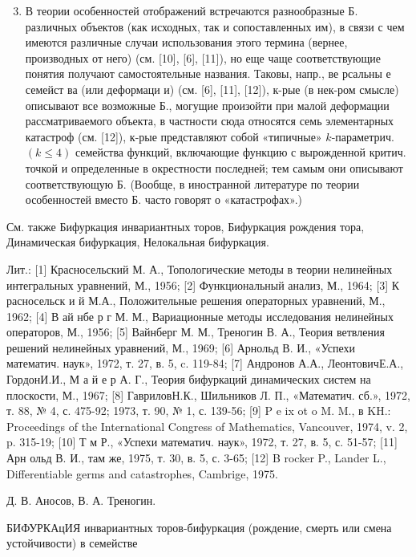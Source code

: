 \documentclass[10pt]{article}
\begin{document}
\begin{enumerate}

  \setcounter{enumi}{2}

  \item В теории особенностей отображений встречаются разнообразные Б. различных объектов (как исходных, так и сопоставленных им), в связи с чем имеются различные случаи использования этого термина (вернее, производных от него) (см. [10], [6], [11]), но еще чаще соответствующие понятия получают самостоятельные названия. Таковы, напр., ве рсальны е семейст ва (или деформаци и) (см. [6], [11], [12]), к-рые (в нек-ром смысле) описывают все возможные Б., могущие произойти при малой деформации рассматриваемого объекта, в частности сюда относятся семь элементарных катастроф (см. [12]), к-рые представляют собой «типичные» $k$-параметрич. $(k \leqslant 4)$ семейства функций, включающие функцию с вырожденной критич. точкой и определенные в окрестности последней; тем самым они описывают соответствующую Б. (Вообще, в иностранной литературе по теории особенностей вместо Б. часто говорят о «катастрофах».)

\end{enumerate}



См. также Бифуркация инвариантных торов, Бифуркация рождения тора, Динамическая бифуркация, Нелокальная бифуркация.



Лит.: [1] Красносельский М. А., Топологические методы в теории нелинейных интегральных уравнений, М., 1956; [2] Функциональный анализ, М., 1964; [3] К расносельск и й М.А., Положительные решения операторных уравнений, М., 1962; [4] В ай нбе р г М. М., Вариационные методы исследования нелинейных операторов, М., 1956; [5] Вайнберг М. М., Треногин В. А., Теория ветвления решений нелинейных уравнений, М., 1969; [6] Арнольд В. И., «Успехи математич. наук», 1972, т. 27, в. 5, c. 119-84; [7] Андронов А.А., ЛеонтовичЕ.А., ГордонИ.И., М а й е р А. Г., Теория бифуркаций динамических систем на плоскости, М., 1967; [8] ГавриловН.К., Шильников Л. П., «Математич. сб.», 1972, т. 88, № 4, с. 475-92; 1973, т. 90, № 1, с. 139-56; [9] P e ix ot o M. M., в KH.: Proceedings of the International Congress of Mathematics, Vancouver, 1974, v. 2, p. 315-19; [10] Т м Р., «Успехи математич. наук», 1972, т. 27, в. 5, с. 51-57; [11] Арн ольд В. И., там же, 1975, т. 30, в. 5, с. 3-65; [12] B rocker P., Lander L., Differentiable germs and catastrophes, Cambrige, 1975.



Д. В. Аносов, В. А. Треногин.



БИФУРКАцИЯ инвариантных торов-бифуркация (рождение, смерть или смена устойчивости) в семействе
\end{document}

